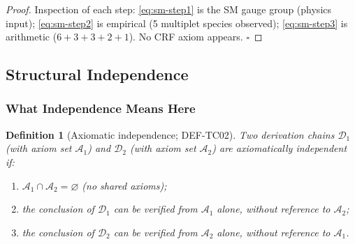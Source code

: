 \documentclass[12pt, a4paper]{article}
\newtheorem{definition}{Definition}[section]
\begin{document}
\begin{proof}
Inspection of each step: \eqref{eq:sm-step1} is the SM gauge group
(physics input); \eqref{eq:sm-step2} is empirical (5 multiplet
species observed); \eqref{eq:sm-step3} is arithmetic ($6+3+3+2+1$).
No CRF axiom appears. \hfill$\square$
\end{proof}

\subsection{Structural Independence}
\label{sec:independence}

\subsubsection{What Independence Means Here}

\begin{definition}[Axiomatic independence; DEF-TC02]
\label{def:independence}
Two derivation chains $\mathcal{D}_1$ (with axiom set $\mathcal{A}_1$)
and $\mathcal{D}_2$ (with axiom set $\mathcal{A}_2$) are
\emph{axiomatically independent} if:
\begin{enumerate}[leftmargin=*, label=(\roman*)]
  \item $\mathcal{A}_1 \cap \mathcal{A}_2 = \varnothing$
    (no shared axioms);
  \item the conclusion of $\mathcal{D}_1$ can be verified from
    $\mathcal{A}_1$ alone, without reference to $\mathcal{A}_2$;
  \item the conclusion of $\mathcal{D}_2$ can be verified from
    $\mathcal{A}_2$ alone, without reference to $\mathcal{A}_1$.
\end{enumerate}
\end{definition}
\end{document}
